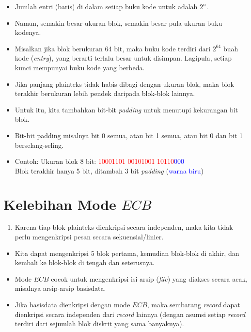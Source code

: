 \documentclass{article}
\begin{document}
\newpage


\begin{itemize}
    \item Jumlah entri (baris) di dalam setiap buku kode untuk adalah $2^n$.
    \item Namun, semakin besar ukuran blok, semakin besar pula ukuran buku kodenya.
    \item Misalkan jika blok berukuran 64 bit, maka buku kode terdiri dari $2^{64}$ buah kode (\textit{entry}), yang berarti terlalu besar untuk disimpan. Lagipula, setiap kunci mempunyai buku kode yang berbeda.
\end{itemize}

\newpage


\begin{itemize}
    \item Jika panjang plainteks tidak habis dibagi dengan ukuran blok, maka blok terakhir berukuran lebih pendek daripada blok-blok lainnya.
    \item Untuk itu, kita tambahkan bit-bit \textit{padding} untuk menutupi kekurangan bit blok.
    \item Bit-bit padding misalnya bit 0 semua, atau bit 1 semua, atau bit 0 dan bit 1 berselang-seling.
    \item Contoh: Ukuran blok 8 bit: \textcolor{red}{10001101} \textcolor{red}{00101001} \textcolor{red}{10110}\textcolor{blue}{000}\\
    Blok terakhir hanya 5 bit, ditambah 3 bit \textit{padding} (\textcolor{blue}{warna biru})
\end{itemize}

\newpage


\section*{Kelebihan Mode $ECB$}

\begin{enumerate}
    \item Karena tiap blok plainteks dienkripsi secara independen, maka kita tidak perlu mengenkripsi pesan secara sekuensial/linier.
\end{enumerate}

\begin{itemize}
    \item Kita dapat mengenkripsi 5 blok pertama, kemudian blok-blok di akhir, dan kembali ke blok-blok di tengah dan seterusnya.
    \item Mode $ECB$ cocok untuk mengenkripsi isi arsip (\textit{file}) yang diakses secara acak, misalnya arsip-arsip basisdata.
    \item Jika basisdata dienkripsi dengan mode $ECB$, maka sembarang \textit{record} dapat dienkripsi secara independen dari \textit{record} lainnya (dengan asumsi setiap \textit{record} terdiri dari sejumlah blok diskrit yang sama banyaknya).
\end{itemize}
\end{document}
